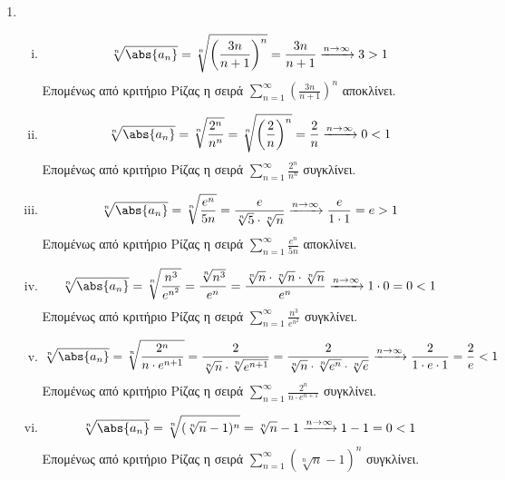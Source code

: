 \begin{enumerate}
\item 
    \begin{enumerate}[i)]
        \item 
            \[
                \sqrt[n]{\abs{a_{n}}} = \sqrt[n]{\left(\frac{3n}{n+1} \right)^{n}} = 
                \frac{3n}{n+1}\xrightarrow{n \to \infty} 3 > 1 
            \]
            Επομένως από κριτήριο Ρίζας η σειρά $ \sum_{n=1}^{\infty} 
            \left(\frac{3n}{n+1}\right)^{n} $ αποκλίνει.

        \item 
            \[
                \sqrt[n]{\abs{a_{n}}} = \sqrt[n]{\frac{2^{n}}{n^{n}}} = 
                \sqrt[n]{\left(\frac{2}{n} \right)^{n}} = \frac{2}{n} 
                \xrightarrow{n \to \infty} 0 < 1
            \] 
            Επομένως από κριτήριο Ρίζας η σειρά $ \sum_{n=1}^{\infty} 
            \frac{2^{n}}{n^{n}} $ συγκλίνει.

        \item 
            \[
                \sqrt[n]{\abs{a_{n}}} = \sqrt[n]{\frac{e^{n}}{5n}} = 
                \frac{e}{\sqrt[n]{5} \cdot \sqrt[n]{n}} \xrightarrow{n \to \infty} 
                \frac{e}{1 \cdot 1} = e>1
            \] 
            Επομένως από κριτήριο Ρίζας η σειρά 
            $ \sum_{n=1}^{\infty} \frac{e^{n}}{5n} $ αποκλίνει.

        \item 
            \[
                \sqrt[n]{\abs{a_{n}}} = \sqrt[n]{\frac{n^{3}}{e^{n^{2}}}} = 
                \frac{\sqrt[n]{n^{3}} }{e^{n}} = \frac{\sqrt[n]{n} \cdot 
                \sqrt[n]{n} \cdot \sqrt[n]{n}}{e^{n}} \xrightarrow{n \to \infty} 
                1\cdot 0 = 0 <1
            \] 
            Επομένως από κριτήριο Ρίζας η σειρά 
            $ \sum_{n=1}^{\infty} \frac{n^{3}}{e^{n^{2}}} $ συγκλίνει.

        \item 
            \[
                \sqrt[n]{\abs{a_{n}}} = \sqrt[n]{\frac{2^{n}}{n\cdot e^{n+1}}} = 
                \frac{2}{\sqrt[n]{n} \cdot \sqrt[n]{e^{n+1}}} = 
                \frac{2}{\sqrt[n]{n} \cdot \sqrt[n]{e^{n}}\cdot \sqrt[n]{e}}
                \xrightarrow{n \to \infty} \frac{2}{1 \cdot e \cdot 1} = 
                \frac{2}{e} <1
            \] 
            Επομένως από κριτήριο Ρίζας η σειρά 
            $ \sum_{n=1}^{\infty} \frac{2^{n}}{n \cdot e^{n+1}} $ συγκλίνει.

        \item 
            \[
                \sqrt[n]{\abs{a_{n}}} = \sqrt[n]{(\sqrt[n]{n} -1)^{n}} = 
                \sqrt[n]{n} - 1 \xrightarrow{n \to \infty} 1-1=0 <1
            \]
            Επομένως από κριτήριο Ρίζας η σειρά 
            $ \sum_{n=1}^{\infty} (\sqrt[n]{n} -1)^{n} $ συγκλίνει.


\end{enumerate}
\end{enumerate}
